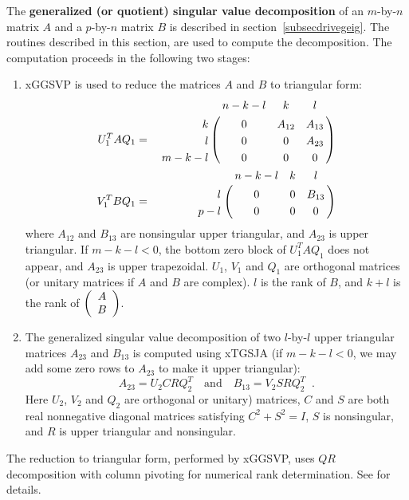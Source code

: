 The {\bf generalized (or quotient) singular value decomposition}
of an $m$-by-$n$ matrix $A$ and a $p$-by-$n$ matrix $B$ is described
in section~\ref{subsecdrivegeig}.
The routines described in this section, are used
to compute the decomposition. The computation proceeds in the following
two stages:

\begin{enumerate}

\item xGGSVP is used to reduce the matrices $A$ and $B$ to triangular form:
\begin{eqnarray*}
U^T_1 A Q_1 & = & \bordermatrix{    &   n-k-l   & k   &  l   \cr
                 \hfill  k  & 0         & A_{12}  & A_{13}  \cr
                 \hfill  l  & 0         &  0      & A_{23}   \cr
                         m-k-l & 0      & 0       & 0       } \\
V^T_1 B Q_1 & = & \bordermatrix{    &   n-k-l   & k   &  l   \cr
                 \hfill  l  & 0         & 0       & B_{13}  \cr
                        p-l & 0         &  0      & 0 }
\end{eqnarray*}
where $A_{12}$ and $B_{13}$ are nonsingular upper triangular, and
$A_{23}$ is upper triangular.
If $m-k-l < 0$, the bottom zero block of $U_1^T A Q_1$ does not appear,
and $A_{23}$ is upper trapezoidal.
$U_1$, $V_1$ and $Q_1$ are
orthogonal matrices (or unitary matrices if $A$ and $B$ are complex).
$l$ is the rank of $B$, and
$k+l$  is the rank of $\bmat{c}  A  \\ B \emat$.

\item The generalized singular value decomposition of two $l$-by-$l$
upper triangular matrices $A_{23}$ and $B_{13}$ is computed using
xTGSJA (if $m-k-l < 0$, we may add some zero rows to $A_{23}$ to make
it upper triangular):
\[
 A_{23} =  U_2 C R Q^T_2  \quad  \mbox{and} \quad
 B_{13} =  V_2 S R Q^T_2  \; \; .
\]
Here $U_2$, $V_2$ and $Q_2$ are orthogonal or unitary) matrices,
$C$ and $S$ are both real
nonnegative diagonal matrices satisfying $C^2 + S^2 = I$, $S$ is nonsingular,
and $R$ is upper triangular and nonsingular.

\end{enumerate}

The reduction to triangular form, performed by
xGGSVP, uses $QR$ decomposition with column pivoting
for numerical rank determination.  See \cite{baizha93} for details.

